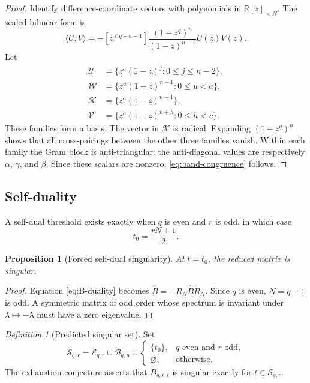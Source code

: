 \documentclass[11pt]{amsart}
\newcommand{\R}{\mathbb R}
\newcommand{\cB}{\widehat B}
\newcommand{\Bands}{\mathcal B}
\newcommand{\Sing}{\mathcal S}
\newcommand{\1}{\mathbf 1}
\newtheorem{proposition}[theorem]{Proposition}
\theoremstyle{remark}
\newtheorem{definition}[theorem]{Definition}
\begin{document}
\begin{proof}
Identify difference-coordinate vectors with polynomials in $\R[z]_{<N}$. The scaled bilinear form is
\[
 \langle U,V\rangle=-[z^{\ell q+a-1}]
 \frac{(1-z^q)^n}{(1-z)^{n-1}}U(z)V(z).
\]
Let
\begin{align*}
 \mathcal U&=\{z^a(1-z)^j:0\le j\le n-2\},\\
 \mathcal W&=\{z^u(1-z)^{n-1}:0\le u<a\},\\
 \mathcal K&=\{z^a(1-z)^{n-1}\},\\
 \mathcal V&=\{z^a(1-z)^{n+h}:0\le h<c\}.
\end{align*}
These families form a basis. The vector in $\mathcal K$ is radical. Expanding $(1-z^q)^n$ shows that all cross-pairings between the other three families vanish. Within each family the Gram block is anti-triangular: the anti-diagonal values are respectively $\alpha$, $\gamma$, and $\beta$. Since these scalars are nonzero, \eqref{eq:band-congruence} follows.
\end{proof}

\subsection{Self-duality}
A self-dual threshold exists exactly when $q$ is even and $r$ is odd, in which case
\begin{equation}\label{eq:t0-main}
 t_0=\frac{rN+1}{2}.
\end{equation}

\begin{proposition}[Forced self-dual singularity]\label{prop:selfdual}
At $t=t_0$, the reduced matrix is singular.
\end{proposition}

\begin{proof}
Equation \eqref{eq:B-duality} becomes $\cB=-R_N\cB R_N$. Since $q$ is even, $N=q-1$ is odd. A symmetric matrix of odd order whose spectrum is invariant under $\lambda\mapsto-\lambda$ must have a zero eigenvalue.
\end{proof}

\begin{definition}[Predicted singular set]
Set
\begin{equation}\label{eq:predicted-main}
 \Sing_{q,r}=\mathcal E_{q,r}\cup\Bands_{q,n}\cup
 \begin{cases}
 \{t_0\},&q\text{ even and }r\text{ odd},\\
 \varnothing,&\text{otherwise}.
 \end{cases}
\end{equation}
The exhaustion conjecture asserts that $B_{q,r,t}$ is singular exactly for $t\in\Sing_{q,r}$.
\end{definition}
\end{document}
